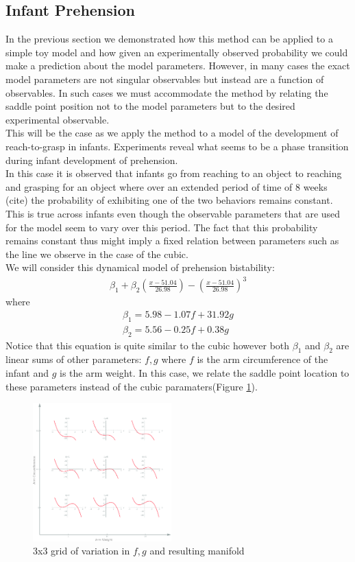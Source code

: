 \documentclass[letterpaper]{article}
\begin{document}
\subsection{Infant Prehension}
In the previous section we demonstrated how this method can be applied to a simple
toy model and how given an experimentally observed probability we could make a prediction
about the model parameters. However, in many cases the exact model parameters are 
not singular observables but instead are a function of observables. In such cases we 
must accommodate the method by relating the saddle point position not to the model
parameters but to the desired experimental observable.\\
This will be the case as we apply the method to a model of the development of 
reach-to-grasp in infants. Experiments reveal what seems to be a phase transition 
during infant development of prehension. \\
In this case it is observed that infants go 
from reaching to an object to reaching and grasping for an object where over an extended
period of time of 8 weeks (cite) the probability of exhibiting one of the two behaviors 
remains constant. This is true across infants even though the observable parameters
that are used for the model seem to vary over this period. The fact that this probability
remains constant thus might imply a fixed relation between parameters such as the line
we observe in the case of the cubic.\\
We will consider this dynamical model of prehension bistability:
\begin{eqnarray}
  \beta_1 + \beta_2 (\frac{x-51.04}{26.98}) - (\frac{x-51.04}{26.98})^3
\end{eqnarray}
where
\begin{eqnarray}
  \beta_1 = 5.98 - 1.07f + 31.92g\\
  \beta_2 = 5.56 - 0.25f + 0.38g
\end{eqnarray}
Notice that this equation is quite similar to the cubic however both $\beta_1$ and 
$\beta_2$ are linear sums of other parameters: $f,g$ where $f$ is the arm circumference
of the infant and $g$ is the arm weight. In this case, we relate the saddle point 
location to these parameters instead of the cubic paramaters(Figure \ref{fig5}).

\begin{figure}[t]
\begin{center}
\includegraphics[width=2.1in,angle=0]{./prehension_params.png}
\caption{3x3 grid of variation in $f,g$ and resulting manifold}
\label{fig5}
\end{center}
\end{figure}
\end{document}
